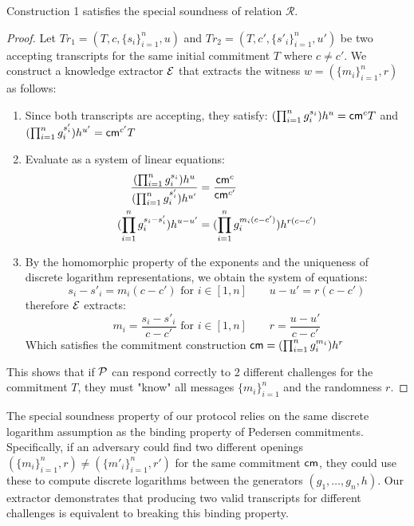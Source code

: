 {\begin{theorem}
    Construction 1 satisfies the special soundness of relation $\mathcal{R}$. 
\end{theorem}
\begin{proof}
    Let $Tr_1 = (T, c, \{s_i\}_{i=1}^n, u)$ and $Tr_2 = (T, c', \{s'_i\}_{i=1}^n, u')$ be two accepting transcripts for the same initial commitment $T$ where $c \neq c'$. We construct a knowledge extractor $\mathcal{E}$ that extracts the witness $w = (\{m_i\}_{i=1}^n,r)$ as follows:
    \begin{enumerate}
        \item Since both transcripts are accepting, they satisfy: 
        $(\prod_{i=1}^n g_i^{s_i})h^u = \mathsf{cm}^cT$ and $(\prod_{i=1}^n g_i^{s'_i})h^{u'} = \mathsf{cm}^{c'}T$
        
        \item Evaluate as a system of linear equations:
             \begin{align}
               \frac{(\prod_{i=1}^n g_i^{s_i})h^u}{(\prod_{i=1}^n g_i^{s'_i})h^{u'}} &= \frac{\mathsf{cm}^c}{\mathsf{cm}^{c'}} \notag \\
               (\prod_{i=1}^n g_i^{s_i-s'_i})h^{u-u'} &= (\prod_{i=1}^n g_i^{m_i(c-c')})h^{r(c-c')} \notag
            \end{align}
            
       \item By the homomorphic property of the exponents and the uniqueness of discrete logarithm representations, we obtain the system of equations:
       \[
       s_i-s'_i = m_i(c-c') \text{ for } i \in [1,n] \qquad u-u' = r(c-c')
       \] 
       therefore $\mathcal{E}$ extracts: 
       \[
       m_i = \frac{s_i-s'_i}{c-c'} \text{ for } i \in [1,n] \qquad r = \frac{u-u'}{c-c'}
       \]
       Which satisfies the commitment construction $\mathsf{cm} = (\prod_{i=1}^n g_i^{m_i})h^r$
    \end{enumerate}
    This shows that if $\mathcal{P}$ can respond correctly to 2 different challenges for the commitment $T$, they must "know" all messages $\{m_i\}_{i=1}^n$ and the randomness $r$.
\end{proof}



\begin{remark}
    The special soundness property of our protocol relies on the same discrete logarithm assumption as the binding property of Pedersen commitments. Specifically, if an adversary could find two different openings $(\{m_i\}_{i=1}^n, r) \neq (\{m'_i\}_{i=1}^n, r')$ for the same commitment $\mathsf{cm}$, they could use these to compute discrete logarithms between the generators $(g_1,\ldots,g_n,h)$. Our extractor demonstrates that producing two valid transcripts for different challenges is equivalent to breaking this binding property.
\end{remark}



}

